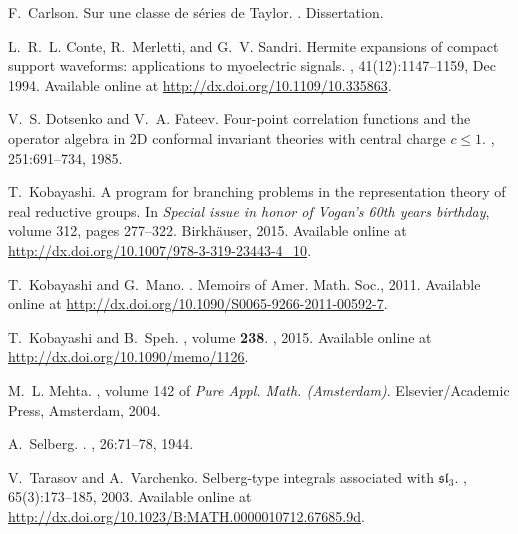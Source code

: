 \begin{thebibliography}{CMS94}

F.~Carlson.
\newblock Sur une classe de s\'eries de {T}aylor.
.
\newblock Dissertation.

L.~R.~L. Conte, R.~Merletti, and G.~V. Sandri.
\newblock Hermite expansions of compact support waveforms: applications to
  myoelectric signals.
, 41(12):1147--1159, Dec 1994.
\newblock Available online at \url{http://dx.doi.org/10.1109/10.335863}.

V.~S. Dotsenko and V.~A. Fateev.
\newblock Four-point correlation functions and the operator algebra in 2{D}
  conformal invariant theories with central charge $c\leq 1$.
, 251:691--734, 1985.

T.~Kobayashi.
\newblock A program for branching problems in the representation theory of real
  reductive groups.
\newblock In {\em {\normalfont Special issue in honor of Vogan's 60th years
  birthday}}, volume 312, pages 277--322. Birkh{\"a}user, 2015.
\newblock Available online at
  \url{http://dx.doi.org/10.1007/978-3-319-23443-4_10}.

T.~Kobayashi and G.~Mano.
.
\newblock Memoirs of Amer. Math. Soc., 2011.
\newblock Available online at
  \url{http://dx.doi.org/10.1090/S0065-9266-2011-00592-7}.

T.~Kobayashi and B.~Speh.
, volume \textbf{238}.
, 2015.
\newblock Available online at \url{http://dx.doi.org/10.1090/memo/1126}.

M.~L. Mehta.
, volume 142 of {\em {\normalfont Pure Appl.
  Math. ({A}msterdam})}.
\newblock Elsevier/{A}cademic {P}ress, {A}msterdam, 2004.

A.~Selberg.
.
, 26:71--78, 1944.

V.~Tarasov and A.~Varchenko.
\newblock Selberg-type integrals associated with $\mathfrak{sl}_3$.
, 65(3):173--185, 2003.
\newblock Available online at
  \url{http://dx.doi.org/10.1023/B:MATH.0000010712.67685.9d}.


\end{thebibliography}
